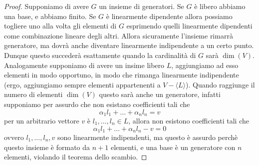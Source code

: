 \documentclass[11pt]{scrartcl}
\begin{document}
	\begin{proof}
		Supponiamo di avere $G$ un insieme di generatori. Se $G$ è libero abbiamo una base, e abbiamo finito. Se $G$ è linearmente dipendente allora possiamo togliere uno alla volta gli elementi di $G$ esprimendo quelli linearmente dipendenti come combinazione lineare degli altri. Allora sicuramente l'insieme rimarrà generatore, ma dovrà anche diventare linearmente indipendente a un certo punto. Dunque questo succederà esattamente quando la cardinalità di $G$ sarà $\dim(V)$. \\
		Analogamente supponiamo di avere un insime libero $L$, aggiungiamo ad esso elementi in modo opportuno, in modo che rimanga linearmente indipendente (ergo, aggiungiamo sempre elementi appartenenti a $V-\langle L \rangle$). Quando raggiunge il numero di elementi $\dim(V)$ questo sarà anche un generatore, infatti supponiamo per assurdo che non esistano coefficienti tali che
		$$\alpha_1l_1+\dots+\alpha_nl_n=v$$
		per un arbitrario vettore $v$ è $l_1,\dots,l_n\in L$, allora non esistono coefficienti tali che
		$$\alpha_1l_1+\dots+\alpha_nl_n-v=0$$
		ovvero $l_1,\dots,l_n,v$ sono linearmente indipendenti, ma questo è assurdo perchè questo insieme è formato da $n+1$ elementi, e una base è un generatore con $n$ elementi, violando il teorema dello scambio.
	\end{proof}
\end{document}
